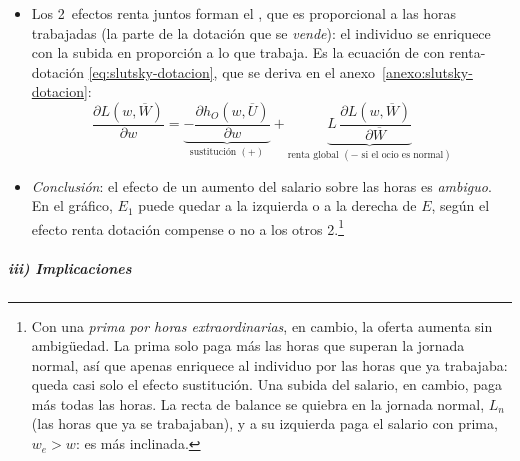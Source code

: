 \documentclass[11pt]{article}
\begin{document}
\begin{itemize}
\item Los 2~efectos renta juntos forman el , que es proporcional a las horas trabajadas (la parte de la dotación que se \emph{vende}): el individuo se enriquece con la subida en proporción a lo que trabaja. Es la ecuación de  con renta-dotación \eqref{eq:slutsky-dotacion}, que se deriva en el anexo~\ref{anexo:slutsky-dotacion}:
  \[
  \frac{\partial L(w,\overline{W})}{\partial w}=\underbrace{-\frac{\partial h_O(w,\overline{U})}{\partial w}}_{\text{sustitución }(+)}+\underbrace{L\,\frac{\partial L(w,\overline{W})}{\partial\overline{W}}}_{\text{renta global }(-\text{ si el ocio es normal})}
  \]
\item \emph{Conclusión}: el efecto de un aumento del salario sobre las horas es \emph{ambiguo}. En el gráfico, $E_1$ puede quedar a la izquierda o a la derecha de $E$, según el efecto renta dotación compense o no a los otros 2.\footnote{Con una \emph{prima por horas extraordinarias}, en cambio, la oferta aumenta sin ambigüedad. La prima solo paga más las horas que superan la jornada normal, así que apenas enriquece al individuo por las horas que ya trabajaba: queda casi solo el efecto sustitución. Una subida del salario, en cambio, paga más todas las horas. La recta de balance se quiebra en la jornada normal, $L_n$ (las horas que ya se trabajaban), y a su izquierda paga el salario con prima, $w_e>w$: es más inclinada.}
\end{itemize}

\subparagraph{iii) Implicaciones}
\end{document}
